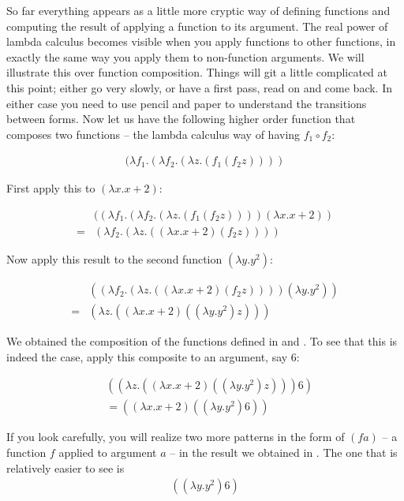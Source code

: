 \documentclass[11pt]{article}
\begin{document}
So far everything appears as a little more cryptic way of defining functions and computing the result of applying a function to its argument. The real power of lambda calculus becomes visible when you apply functions to other functions, in exactly the same way you apply them to non-function arguments. We will illustrate this over function composition. Things will git a little complicated at this point; either go very slowly, or have a first pass, read on and come back. In either case you need to use pencil and paper to understand the transitions between forms.  Now let us have the following higher order function that composes two functions -- the lambda calculus way of having $f_1\circ f_2$:

\begin{align}
(\lambda f_1.(\lambda f_2.(\lambda z.(f_1(f_2z))))
\end{align}

First apply this to $(\lambda x. x + 2)$:

\begin{align}
& ((\lambda f_1.(\lambda f_2.(\lambda z.(f_1(f_2z)))) (\lambda x. x +2))\\
=& (\lambda f_2.(\lambda z.((\lambda x. x +2)(f_2z)))) \nonumber
\end{align}

Now apply this result to the second function $(\lambda y. y^2)$:

\begin{align}
&  ((\lambda f_2.(\lambda z.((\lambda x. x +2)(f_2z))))(\lambda y. y^2)) \\
=& (\lambda z.((\lambda x. x+2)((\lambda y. y^2)z))) \nonumber
\end{align}

We obtained the composition of the functions defined in  and . To see that this is indeed the case, apply this composite to an argument, say 6:

\begin{align}
\label{faint} & ((\lambda z.((\lambda x. x+2)((\lambda y. y^2)z))) 6)\\
&=  ((\lambda x. x+2)((\lambda y. y^2)6))\nonumber 
\end{align}

If you look carefully, you will realize two more patterns in the form of $(f a)$ -- a function $f$ applied to argument $a$ -- in the result we obtained in . The one that is relatively easier to see is  
\begin{align}
\label{occ1} ((\lambda y. y^2)6)
\end{align}
\end{document}

